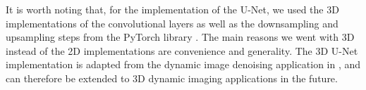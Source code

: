\documentclass[12pt]{article}
\begin{document}
It is worth noting that, for the implementation of the U-Net, 
we used the 3D implementations of the convolutional layers as well as the downsampling and upsampling steps from the PyTorch library \cite{PyTorch}.
The main reasons we went with 3D instead of the 2D implementations are convenience and generality.
The 3D U-Net implementation is adapted from the dynamic image denoising application in \cite{kofler2023learning}, and can therefore be extended to 3D dynamic imaging applications in the future.



















        
\end{document}
